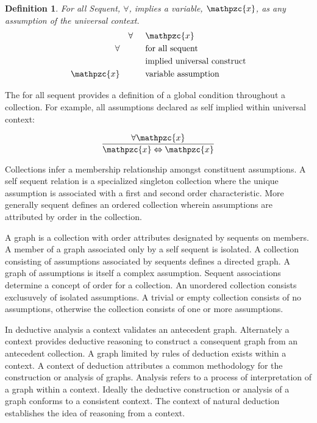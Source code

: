 \documentclass[aps,twocolumn,secnumarabic,nobalancelastpage,amsmath,amssymb,
amsthm,nofootinbib,parskip=full]{revtex4}
\numberwithin{equation}{section}
\newtheorem{definition}{Definition}[section]
\newcommand{\obk}[1]{\mathpzc{#1}}
\begin{document}
\begin{definition}{For all Sequent, $\forall$}\label{def:forallsequent},
  implies a variable, $\obk{x}$, as any assumption of the universal context.
  \begin{equation*}
  \begin{array}{rll}
   &\forall&\obk{x} \\[3pt]
   \forall&\quad&\text{for all sequent} \\[3pt]
   &\quad&\text{implied universal construct} \\[3pt]
   \obk{x}&\quad&\text{variable assumption}
  \end{array}
  \end{equation*}
\end{definition}

The for all sequent provides a definition of a global condition
throughout a collection.
For example, all assumptions declared as self implied within universal context:

\begin{equation*}
\frac{\forall\obk{x}}{\obk{x}\Leftrightarrow\obk{x}}
\end{equation*}

Collections infer a membership relationship amongst constituent assumptions.
A self sequent relation is a specialized singleton collection
where the unique assumption is associated with a
first and second order characteristic.
More generally sequent defines an ordered collection wherein
assumptions are attributed by order in the collection.

A graph is a collection with order attributes designated by sequents on members.
A member of a graph associated only by a self sequent is isolated.
A collection consisting of assumptions associated by sequents
defines a directed graph.
A graph of assumptions is itself a complex assumption.
Sequent associations determine a concept of order for a collection.
An unordered collection consists exclusuvely of isolated assumptions.
A trivial or empty collection consists of no assumptions, otherwise the
collection consists of one or more assumptions.

In deductive analysis a context validates an antecedent graph.
Alternately a context provides deductive reasoning to construct
a consequent graph from an antecedent collection.
A graph limited by rules of deduction exists within a context.
A context of deduction attributes a common methodology for the
construction or analysis of graphs.
Analysis refers to a process of interpretation of a graph within a context.
Ideally the deductive  construction or analysis of a graph conforms to a
consistent context.
The context of natural deduction establishes the idea
of reasoning from a context.
\end{document}
